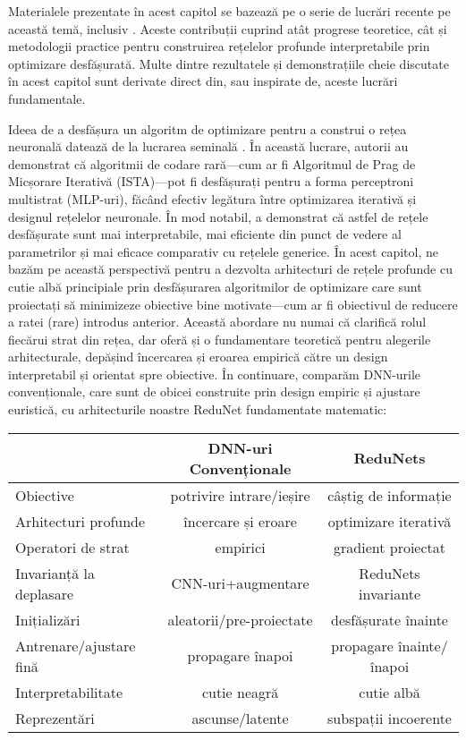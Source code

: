 \documentclass[../../book-main_ro.tex]{subfiles}
\begin{document}
Materialele prezentate în acest capitol se bazează pe o serie de lucrări recente pe această temă, inclusiv \cite{chan2021redunet, wang2024global, wang2025attention, wu2025token, yu2023white}. Aceste contribuții cuprind atât progrese teoretice, cât și metodologii practice pentru construirea rețelelor profunde interpretabile prin optimizare desfășurată. Multe dintre rezultatele și demonstrațiile cheie discutate în acest capitol sunt derivate direct din, sau inspirate de, aceste lucrări fundamentale.


Ideea de a desfășura un algoritm de optimizare pentru a construi o rețea neuronală datează de la lucrarea seminală \cite{gregor2010learning}. În această lucrare, autorii au demonstrat că algoritmii de codare rară—cum ar fi Algoritmul de Prag de Micșorare Iterativă (ISTA)—pot fi desfășurați pentru a forma perceptroni multistrat (MLP-uri), făcând efectiv legătura între optimizarea iterativă și designul rețelelor neuronale. În mod notabil, \cite{monga2019algorithm} a demonstrat că astfel de rețele desfășurate sunt mai interpretabile, mai eficiente din punct de vedere al parametrilor și mai eficace comparativ cu rețelele generice. În acest capitol, ne bazăm pe această perspectivă pentru a dezvolta arhitecturi de rețele profunde cu cutie albă principiale prin desfășurarea algoritmilor de optimizare care sunt proiectați să minimizeze obiective bine motivate—cum ar fi obiectivul de reducere a ratei (rare) introdus anterior. Această abordare nu numai că clarifică rolul fiecărui strat din rețea, dar oferă și o fundamentare teoretică pentru alegerile arhitecturale, depășind încercarea și eroarea empirică către un design interpretabil și orientat spre obiective. În continuare, comparăm DNN-urile convenționale, care sunt de obicei construite prin design empiric și ajustare euristică, cu arhitecturile noastre ReduNet fundamentate matematic:

\begin{center}
\begin{tabular}{| l || c | c |}
\hline
  & DNN-uri Convenționale & ReduNets\\ [0.5ex]
  \hline \hline
Obiective & potrivire intrare/ieșire & câștig de informație\\ [0.5ex]
  \hline
Arhitecturi profunde & încercare și eroare & optimizare iterativă \\  [0.5ex]
\hline
Operatori de strat & empirici & gradient proiectat \\  [0.5ex]
\hline
Invarianță la deplasare & CNN-uri+augmentare & ReduNets invariante \\  [0.5ex]
\hline
Inițializări & aleatorii/pre-proiectate & desfășurate înainte \\ [0.5ex]
\hline
Antrenare/ajustare fină & propagare înapoi & propagare înainte/înapoi\\ [0.5ex]
\hline
Interpretabilitate & cutie neagră & cutie albă \\ [0.5ex]
\hline
Reprezentări & ascunse/latente & subspații incoerente \\ [0.5ex]
\hline
\end{tabular}
\end{center}
\end{document}
